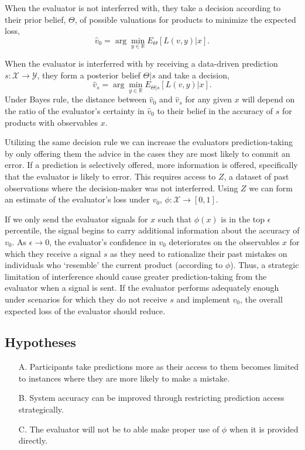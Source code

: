 \documentclass[10pt]{article}
\newcommand{\X}{\mathcal{X}}
\newcommand{\Y}{\mathcal{Y}}
\begin{document}
When the evaluator is not interferred with, they take a decision according to their prior belief, $\Theta$, of possible valuations for products to minimize the expected loss,
$$\hat{v}_0 = \arg \min_{y \in \mathbb{R}}E_\Theta[L(v,y)|x].$$

When the evaluator is interferred with by receiving a data-driven prediction $s: \X \to \Y$, they form a posterior belief $\Theta|s$ and take a decision,
$$\hat{v}_s = \arg \min_{y \in \mathbb{R}}E_{\Theta|s}[L(v,y)|x].$$
Under Bayes rule, the distance between $\hat{v}_0$ and $\hat{v}_s$ for any given $x$ will depend on the ratio of the evaluator's certainty in $\hat{v}_0$ to their belief in the accuracy of $s$ for products with observables $x$.

Utilizing the same decision rule we can increase the evaluators prediction-taking by only offering them the advice in the cases they are most likely to commit an error. If a prediction is selectively offered, more information is offered, specifically that the evaluator is likely to error. This requires access to $Z$, a dataset of past observations where the decision-maker was not interferred. Using $Z$ we can form an estimate of the evaluator's loss under $v_0$, $\phi:\X \to [0,1]$.

If we only send the evaluator signals for $x$ such that $\phi(x)$ is in the top $\epsilon$ percentile, the signal begins to carry additional information about the accuracy of $v_0$. As $\epsilon \to 0$, the evaluator's confidence in $v_0$ deteriorates on the observables $x$ for which they receive a signal $s$ as they need to rationalize their past mistakes on individuals who `resemble' the current product (according to $\phi$). Thus, a strategic limitation of interference should cause greater prediction-taking from the evaluator when a signal is sent. If the evaluator performs adequately enough under scenarios for which they do not receive $s$ and implement $v_0$, the overall expected loss of the evaluator should reduce.


\subsection*{Hypotheses}

\begin{enumerate}
	\item[A.] Participants take predictions more as their access to them becomes limited to instances where they are more likely to make a mistake.
	\item[B.] System accuracy can be improved through restricting prediction access strategically.
	\item[C.] The evaluator will not be to able make proper use of $\phi$ when it is provided directly.
\end{enumerate}
\end{document}
